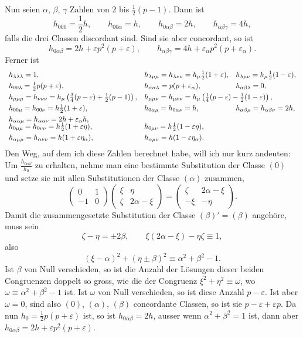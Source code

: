 \documentclass[11pt]{article}
\begin{document}
Nun seien $\alpha$, $\beta$, $\gamma$ Zahlen von $2$ bis $\frac12(p-1)$. Dann ist
\[
h_{000}=\frac12h,\qquad
h_{00\alpha}=h,\qquad
h_{0\alpha\beta}=2h,\qquad
h_{\alpha\beta\gamma}=4h,
\]
falls die drei Classen discordant sind. Sind sie aber concordant, so ist
\[
h_{0\alpha\beta}=2h+\varepsilon p^2(p+\varepsilon),\qquad
h_{\alpha\beta\gamma}=4h+\varepsilon_\alpha p^2(p+\varepsilon_\alpha).
\]
Ferner ist
\[
\begin{array}{lll}
h_{\lambda\lambda\lambda}=1, &
h_{\lambda\mu\mu}=h_{\lambda\nu\nu}=h_\mu\frac12(1+\varepsilon), &
h_{\lambda\mu\nu}=h_\mu\frac12(1-\varepsilon),\\[0.35em]
h_{00\lambda}=\frac12p(p+\varepsilon), &
h_{\alpha\alpha\lambda}=p(p+\varepsilon_\alpha), &
h_{\alpha\beta\lambda}=0,\\[0.35em]
h_{\mu\mu\mu}=h_{\nu\nu\nu}=h_\mu\left(\frac34(p-\varepsilon)+\frac12(p-1)\right),&
\multicolumn{2}{l}{
h_{\mu\mu\nu}=h_{\mu\nu\nu}=h_\mu\left(\frac14(p-\varepsilon)-\frac12(1-\varepsilon)\right),}\\[0.35em]
h_{00\mu}=h_{00\nu}=h\frac12(1+\varepsilon),&
h_{0\alpha\mu}=h_{0\alpha\nu}=h,&
h_{\alpha\beta\mu}=h_{\alpha\beta\nu}=2h,\\[0.35em]
h_{\alpha\alpha\mu}=h_{\alpha\alpha\nu}=2h+\varepsilon_\alpha h,&&\\[-0.2em]
h_{0\mu\mu}=h_{0\nu\nu}=h\frac12(1+\varepsilon\eta),&
h_{0\mu\nu}=h\frac12(1-\varepsilon\eta),&\\[0.35em]
h_{\alpha\mu\mu}=h_{\alpha\nu\nu}=h(1+\varepsilon\eta_\alpha),&
h_{\alpha\mu\nu}=h(1-\varepsilon\eta_\alpha).&
\end{array}
\]
Den Weg, auf dem ich diese Zahlen berechnet habe, will ich nur kurz andeuten: Um $\frac{h_{0\alpha\beta}}{h_0}$ zu erhalten, nehme man eine bestimmte Substitution der Classe $(0)$ und setze sie mit allen Substitutionen der Classe $(\alpha)$ zusammen,
\[
\begin{pmatrix}0&1\\-1&0\end{pmatrix}
\begin{pmatrix}\xi&\eta\\ \zeta&2\alpha-\xi\end{pmatrix}
=
\begin{pmatrix}\zeta&2\alpha-\xi\\ -\xi&-\eta\end{pmatrix}.
\]
Damit die zusammengesetzte Substitution der Classe $(\beta)'=(\beta)$ angehöre, muss sein
\[
\zeta-\eta=\pm2\beta,\qquad
\xi(2\alpha-\xi)-\eta\zeta\equiv1,
\]
also
\[
(\xi-\alpha)^2+(\eta\pm\beta)^2\equiv\alpha^2+\beta^2-1.
\]
Ist $\beta$ von Null verschieden, so ist die Anzahl der Lösungen dieser beiden Congruenzen doppelt so gross, wie die der Congruenz $\xi^2+\eta^2\equiv\omega$, wo $\omega\equiv\alpha^2+\beta^2-1$ ist. Ist $\omega$ von Null verschieden, so ist diese Anzahl $p-\varepsilon$. Ist aber $\omega=0$, sind also $(0)$, $(\alpha)$, $(\beta)$ concordante Classen, so ist sie $p-\varepsilon+\varepsilon p$. Da nun $h_0=\frac12p(p+\varepsilon)$ ist, so ist $h_{0\alpha\beta}=2h$, ausser wenn $\alpha^2+\beta^2=1$ ist, dann aber $h_{0\alpha\beta}=2h+\varepsilon p^2(p+\varepsilon)$.
\end{document}
